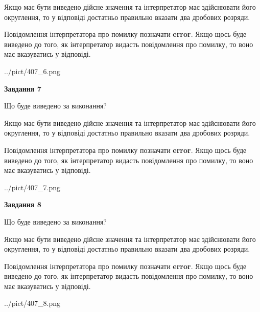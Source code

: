 \documentclass[12pt, ukrainian]{article}
\begin{document}
{\begin {Large}
Якщо має бути виведено дійсне значення та інтерпретатор має здійснювати його округлення, 
то у відповіді достатньо правильно вказати два дробових розряди.

Повідомлення інтерпретатора про помилку позначати \textbf{error}.
Якщо щось буде виведено до того, як інтерпретатор видасть повідомлення про помилку, 
то воно має вказуватись у відповіді. \par

\begin{center}
	{../pict/407_6.png}
\end{center}
\newpage

{\begin {center}\textbf{Завдання 7}\end {center}}\par
Що буде виведено за виконання? \par

Якщо має бути виведено дійсне значення та інтерпретатор має здійснювати його округлення, 
то у відповіді достатньо правильно вказати два дробових розряди.

Повідомлення інтерпретатора про помилку позначати \textbf{error}.
Якщо щось буде виведено до того, як інтерпретатор видасть повідомлення про помилку, 
то воно має вказуватись у відповіді. \par

\begin{center}
	{../pict/407_7.png}
\end{center}
\newpage

{\begin {center}\textbf{Завдання 8}\end {center}}\par
Що буде виведено за виконання? \par

Якщо має бути виведено дійсне значення та інтерпретатор має здійснювати його округлення, 
то у відповіді достатньо правильно вказати два дробових розряди.

Повідомлення інтерпретатора про помилку позначати \textbf{error}.
Якщо щось буде виведено до того, як інтерпретатор видасть повідомлення про помилку, 
то воно має вказуватись у відповіді. \par

\begin{center}
	{../pict/407_8.png}
\end{center}
\newpage


\end{Large}}
\end{document}
